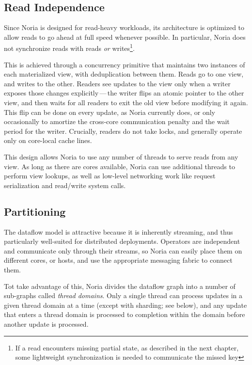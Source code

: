 \subsection{Read Independence}

Since Noria is designed for read-heavy workloads, its architecture is optimized
to allow reads to go ahead at full speed whenever possible. In particular, Noria
does not synchronize reads with reads \emph{or} writes\footnote{If a read
encounters missing partial state, as described in the next chapter, some
lightweight synchronization is needed to communicate the missed key}.

This is achieved through a concurrency primitive that maintains two instances of
each materialized view, with deduplication between them. Reads go to one view,
and writes to the other. Readers see updates to the view only when a writer
exposes those changes explicitly\,---\,the writer flips an atomic pointer to the
other view, and then waits for all readers to exit the old view before modifying
it again. This flip can be done on every update, as Noria currently does, or
only occasionally to amortize the cross-core communication penalty and the wait
period for the writer. Crucially, readers do not take locks, and generally
operate only on core-local cache lines.

This design allows Noria to use any number of threads to serve reads from any
view. As long as there are cores available, Noria can use additional threads to
perform view lookups, as well as low-level networking work like request
serialization and read/write system calls.

\subsection{Partitioning}
\label{s:noria:partitioning}

The dataflow model is attractive because it is inherently streaming, and thus
particularly well-suited for distributed deployments. Operators are independent
and communicate only through their streams, so Noria can easily place them
on different cores, or hosts, and use the appropriate messaging fabric to
connect them.

Tot take advantage of this, Noria divides the dataflow graph into a number of
sub-graphs called \textit{thread domains}. Only a single thread can process
updates in a given thread domain at a time (except with sharding; see below),
and any update that enters a thread domain is processed to completion within
the domain before another update is processed.

